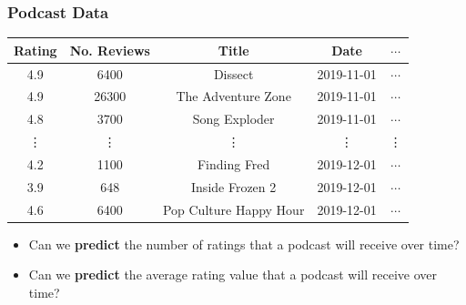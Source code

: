 \subsubsection{Podcast Data}
\begin{table}[H]
    \centering
    \begin{tabular}{ccccc}
        \toprule
        Rating & No. Reviews & Title                  & Date       & $\cdots$ \\
        \midrule
        4.9    & 6400        & Dissect                & 2019-11-01 & $\cdots$ \\%
        4.9    & 26300       & The Adventure Zone     & 2019-11-01 & $\cdots$ \\%
        4.8    & 3700        & Song Exploder          & 2019-11-01 & $\cdots$ \\%
        \vdots & \vdots      & \vdots                 & \vdots     & \vdots   \\%
        4.2    & 1100        & Finding Fred           & 2019-12-01 & $\cdots$ \\%
        3.9    & 648         & Inside Frozen 2        & 2019-12-01 & $\cdots$ \\%
        4.6    & 6400        & Pop Culture Happy Hour & 2019-12-01 & $\cdots$ \\%
        \bottomrule
    \end{tabular}
\end{table}
\begin{itemize}
    \item Can we \textbf{predict} the number of ratings that a podcast will receive over time?
    \item Can we \textbf{predict} the average rating value that a podcast will receive over time?
\end{itemize}
